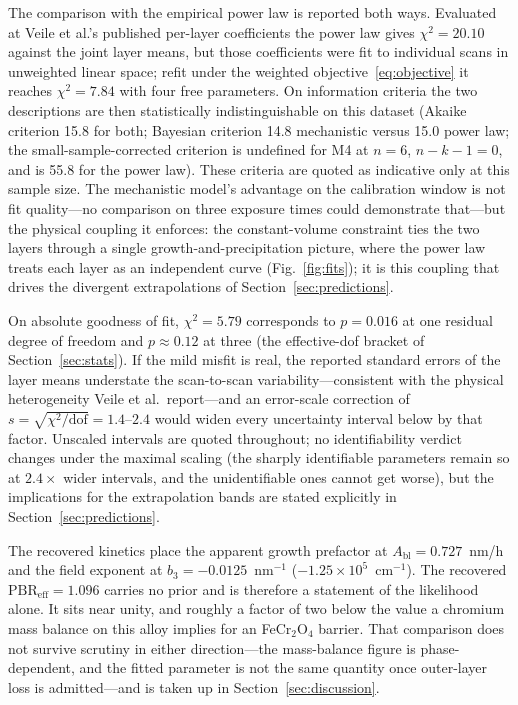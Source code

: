 \documentclass[preprint,12pt]{elsarticle}
\begin{document}
The comparison with the empirical power law is reported both ways.
Evaluated at Veile et al.'s published per-layer coefficients the power
law gives $\chi^2 = 20.10$ against the joint layer means, but those
coefficients were fit to individual scans in unweighted linear space;
refit under the weighted objective~\eqref{eq:objective} it reaches
$\chi^2 = 7.84$ with four free parameters. On information criteria the
two descriptions are then statistically indistinguishable on this
dataset (Akaike criterion 15.8 for both; Bayesian criterion 14.8
mechanistic versus 15.0 power law; the small-sample-corrected criterion
is undefined for M4 at $n=6$, $n-k-1=0$, and is 55.8 for the power
law). These criteria are quoted as indicative only at this sample size.
The mechanistic model's advantage on the calibration window is not fit
quality---no comparison on three exposure times could demonstrate
that---but the physical coupling it enforces: the constant-volume
constraint ties the two layers through a single
growth-and-precipitation picture, where the power law treats each layer
as an independent curve (Fig.~\ref{fig:fits}); it is this coupling that
drives the divergent extrapolations of
Section~\ref{sec:predictions}.

On absolute goodness of fit, $\chi^2 = 5.79$ corresponds to $p = 0.016$
at one residual degree of freedom and $p \approx 0.12$ at three (the
effective-dof bracket of Section~\ref{sec:stats}). If the mild misfit
is real, the reported standard errors of the layer means understate the
scan-to-scan variability---consistent with the physical heterogeneity
Veile et al.\ report---and an error-scale correction of
$s = \sqrt{\chi^2/\text{dof}} = 1.4$--$2.4$ would widen every
uncertainty interval below by that factor. Unscaled intervals are
quoted throughout; no identifiability verdict changes under the maximal
scaling (the sharply identifiable parameters remain so at $2.4\times$
wider intervals, and the unidentifiable ones cannot get worse), but the
implications for the extrapolation bands are stated explicitly in
Section~\ref{sec:predictions}.

The recovered kinetics place the apparent growth prefactor at
$A_\text{bl} = 0.727$~nm/h and the field exponent at
$b_3 = -0.0125$~nm$^{-1}$ ($-1.25\times10^{5}$~cm$^{-1}$). The
recovered $\mathrm{PBR}_\text{eff} = 1.096$ carries no prior and is
therefore a statement of the likelihood alone. It sits near unity, and
roughly a factor of two below the value a chromium mass balance on this
alloy implies for an FeCr$_2$O$_4$ barrier. That comparison does not
survive scrutiny in either direction---the mass-balance figure is
phase-dependent, and the fitted parameter is not the same quantity once
outer-layer loss is admitted---and is taken up in
Section~\ref{sec:discussion}.
\end{document}
